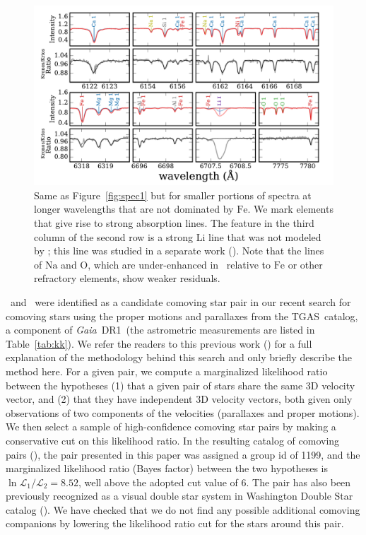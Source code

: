 \documentclass[modern, letterpaper]{aastex61}
\newcommand{\project}[1]{\textsl{#1}}
\newcommand{\acronym}[1]{{\small{#1}}}
\newcommand{\gaia}{\project{Gaia}}
\newcommand{\figname}{Figure}
\newcommand{\dr}{\acronym{DR1}}
\newcommand{\tgas}{\acronym{TGAS}}
\newcommand*\elem[1]{\ensuremath{\mathrm{#1}}}
\newcommand{\sunanalog}{\text{Krios}}
\newcommand{\bizarreone}{\text{Kronos}}
\renewcommand\tablename{Table}
\begin{document}
\begin{figure}[htpb]
  \centering
  \includegraphics[width=0.95\linewidth]{spec2.pdf}
  \caption{Same as \figname~\ref{fig:spec1}
    but for smaller portions of spectra at longer wavelengths that are
    not dominated by \elem{Fe}.
    We mark elements that give rise to strong absorption lines.
    The feature in the third column of the second row is a strong \elem{Li}
    line that was not modeled by \citealt{2016ApJS..225...32B}; this line was
    studied in a separate work (\citealt{jmlithium}).
    Note that the lines of \elem{Na} and \elem{O}, which are under-enhanced
    in \bizarreone\ relative to \elem{Fe} or other refractory elements,
    show weaker residuals.
  }
  \label{fig:spec2}
\end{figure}

\sunanalog\ and \bizarreone\ were identified as a
candidate comoving star pair in our recent search for comoving stars using the
proper motions and parallaxes from the \tgas\ catalog, a component of \gaia\ \dr\
(the astrometric measurements are listed in \tablename~\ref{tab:kk}).
We refer the readers to this previous work (\citealt{2016arXiv161202440O}) for a
full explanation of the methodology behind this search and only briefly describe
the method here.
For a given pair, we compute a marginalized likelihood ratio between the
hypotheses (1) that a given pair of stars share the same 3D velocity vector, and
(2) that they have independent 3D velocity vectors, both given only observations
of two components of the velocities (parallaxes and proper motions).
We then select a sample of high-confidence comoving star pairs by making a
conservative cut on this likelihood ratio.
In the resulting catalog of comoving pairs (\citealt{2016arXiv161202440O}),
the pair presented in this paper was assigned a group id of 1199,
and the marginalized likelihood ratio (Bayes factor)
between the two hypotheses is $\ln{\mathcal{L}_1/\mathcal{L}_2} = 8.52$,
well above the adopted cut value of 6.
The pair has also been previously recognized as a visual double star system
in Washington Double Star catalog (\citealt{2001AJ....122.3466M}).
We have checked that we do not find any possible additional comoving companions
by lowering the likelihood ratio cut for the stars around this pair.
\end{document}
